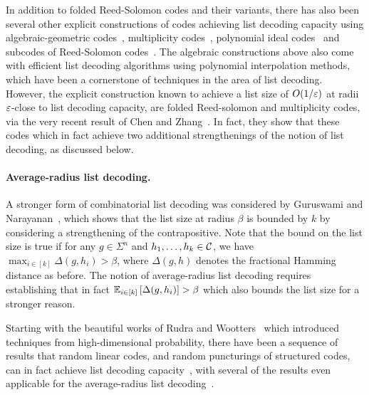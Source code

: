 In addition to folded Reed-Solomon codes and their variants, there has also been several other explicit constructions of codes achieving list decoding capacity using algebraic-geometric codes~\cite{Gur09, GX13, GRZ21, GX22}, multiplicity codes~\cite{Kop15}, polynomial ideal codes~\cite{BHKS23} and subcodes of Reed-Solomon codes~\cite{GX13, BST24}. 
%
The algebraic constructions above also come with efficient list decoding algorithms using polynomial interpolation methods, which have been a cornerstone of techniques in the area of list decoding. 
%
However, the explicit construction known to achieve a list size of $O(1/\varepsilon)$ at radii $\varepsilon$-close to list decoding capacity, are folded Reed-solomon and multiplicity codes, via the very recent result of Chen and Zhang~\cite{CZ24}. In fact, they show that these codes which in fact achieve two additional strengthenings of the notion of list decoding, as discussed below. 


\vspace{-5 pt}
\paragraph{Average-radius list decoding.}
%
A stronger form of combinatorial list decoding was considered by Guruswami and Narayanan~\cite{GN14}, which shows that the list size at radius $\beta$ is bounded by $k$ by considering a strengthening of the contrapositive. 
%
Note that the bound on the list size is true if for any $g \in \Sigma^n$ and $h_1, \ldots, h_{k} \in {\mathcal C}$, we have $\max_{i \in [k]} \Delta(g,h_i) > \beta$, where $\Delta(g,h)$ denotes the fractional Hamming distance as before.
%
The notion of average-radius list decoding requires establishing that in fact $\Ex{i \in [k]}{\Delta(g,h_i)} > \beta$ which also bounds the list size for a stronger reason. 

Starting with the beautiful works of Rudra and Wootters~\cite{Wootters13, RW14} which introduced techniques from high-dimensional probability, there have been a sequence of results that random linear codes, and random puncturings of structured codes, can in fact achieve list decoding capacity~\cite{FKS22, GST23, GLSTW24}, with several of the results even applicable for the average-radius list decoding~\cite{BGM23, GZ23, AGL24}.  
%

\vspace{-5 pt}

